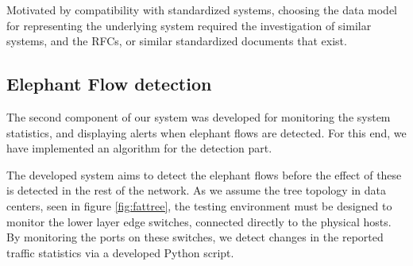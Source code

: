 \par Motivated by compatibility with standardized systems, choosing the data model for representing the underlying system required the investigation of similar 
systems, and the RFCs, or similar standardized documents that exist. 

\subsection {Elephant Flow detection}

The second component of our system was developed for monitoring the system statistics, and displaying alerts when elephant flows are detected. For this end, we have
implemented an algorithm for the detection part. 

\par The developed system aims to detect the elephant flows before the effect of these is detected in the rest of the network. As we assume the tree topology in data
centers, seen in figure \ref{fig:fattree}, the testing environment must be designed to monitor the lower layer edge switches, connected directly to the physical 
hosts. By monitoring the ports on these switches, we detect changes in the reported traffic statistics via a developed Python script.
